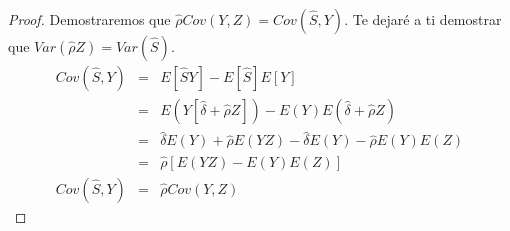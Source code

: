 \documentclass{beamer}
\begin{document}
\begin{frame}[plain]
    \begin{proof}
        Demostraremos que $\widehat{\rho}Cov(Y,Z) = Cov(\widehat{S},Y)$. Te dejaré a ti demostrar que $Var(\widehat{\rho}Z) = Var(\widehat{S})$.
        \begin{eqnarray*}
            Cov(\widehat{S},Y) &=& E[\widehat{S}Y] - E[\widehat{S}]E[Y] \\
            &=& E(Y[\widehat{\delta} + \widehat{\rho}Z]) - E(Y)E(\widehat{\delta} + \widehat{\rho}Z) \\
            &=& \widehat{\delta}E(Y) + \widehat{\rho}E(YZ) - \widehat{\delta}E(Y) - \widehat{\rho}E(Y)E(Z) \\
            &=& \widehat{\rho}[E(YZ) - E(Y)E(Z)] \\
            Cov(\widehat{S},Y) &=& \widehat{\rho}Cov(Y,Z)
        \end{eqnarray*}
        \qedhere
    \end{proof}
\end{frame}








\end{document}
